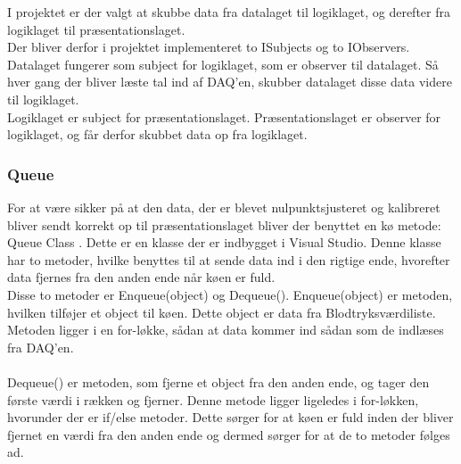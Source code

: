 I projektet er der valgt at skubbe data fra datalaget til logiklaget, og derefter fra logiklaget til præsentationslaget. \\ 
Der bliver derfor i projektet implementeret to ISubjects og to IObservers. Datalaget fungerer som subject for logiklaget, som er observer til datalaget. Så hver gang der bliver læste tal ind af DAQ’en, skubber datalaget disse data videre til logiklaget. \\
Logiklaget er subject for præsentationslaget. Præsentationslaget er observer for logiklaget, og får derfor skubbet data op fra logiklaget.
\subsubsection{Queue}
For at være sikker på at den data, der er blevet nulpunktsjusteret og kalibreret bliver sendt korrekt op til præsentationslaget bliver der benyttet en kø metode: Queue Class \cite{queue}. Dette er en klasse der er indbygget i Visual Studio. Denne klasse har to metoder, hvilke benyttes til at sende data ind i den rigtige ende, hvorefter data fjernes fra den anden ende når køen er fuld. \\Disse to metoder er Enqueue(object) og Dequeue(). Enqueue(object) er metoden, hvilken tilføjer et object til køen. Dette object er data fra Blodtryksværdiliste. Metoden ligger i en for-løkke, sådan at data kommer ind sådan som de indlæses fra DAQ'en. \\\\
Dequeue() er metoden, som fjerne et object fra den anden ende, og tager den første værdi i rækken og fjerner. Denne metode ligger ligeledes i for-løkken, hvorunder der er if/else metoder. Dette sørger for at køen er fuld inden der bliver fjernet en værdi fra den anden ende og dermed sørger for at de to metoder følges ad.
